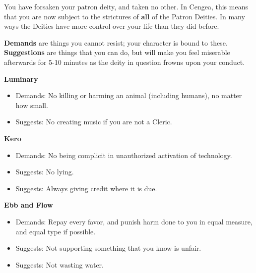\documentclass[green]{GL2020}
\begin{document}
\name{\gAbandonGods{}}

You have forsaken your patron deity, and taken no other. In Cengea, this means that you are now subject to the strictures of \textbf{all} of the Patron Deities. In many ways the Deities have more control over your life than they did before.

\textbf{Demands} are things you cannot resist; your character is bound to these.\\
\textbf{Suggestions} are things that you can do, but will make you feel miserable afterwards for 5-10 minutes as the deity in question frowns upon your conduct.

\vspace{1cm}

\textbf{Luminary}
\begin{itemize}
	\item Demands: No killing or harming an animal (including humans), no matter how small.
	\item Suggests: No creating music if you are not a Cleric.
\end{itemize}

\textbf{Kero}
\begin{itemize}
	\item Demands: No being complicit in unauthorized activation of technology.
	\item Suggests: No lying.
	\item Suggests: Always giving credit where it is due.
\end{itemize}

\textbf{Ebb and Flow}
\begin{itemize}
	\item Demands: Repay every favor, and punish harm done to you in equal measure, and equal type if possible.
	\item Suggests: Not supporting something that you know is unfair.
	\item Suggests: Not wasting water.
\end{itemize}
\end{document}
